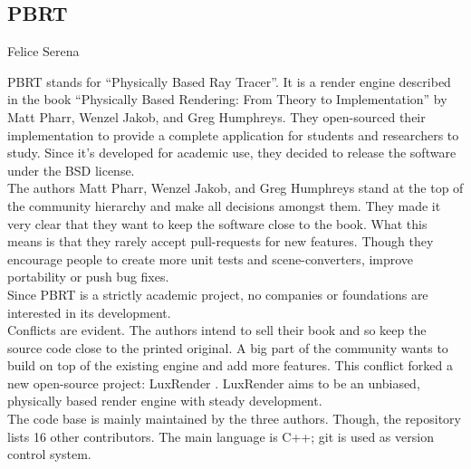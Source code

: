 \subsection{PBRT}{Felice Serena}

PBRT stands for ``Physically Based Ray Tracer''. It is a render engine described in the book ``Physically Based Rendering: From Theory to Implementation'' by Matt Pharr, Wenzel Jakob, and Greg Humphreys. They open-sourced their implementation to provide a complete application for students and researchers to study. Since it's developed for academic use, they decided to release the software under the BSD license. \\

The authors Matt Pharr, Wenzel Jakob, and Greg Humphreys stand at the top of the community hierarchy and make all decisions amongst them. They made it very clear that they want to keep the software close to the book. What this means is that they rarely accept pull-requests for new features. Though they encourage people to create more unit tests and scene-converters, improve portability or push bug fixes. \cite{pbrt-pull-requests} \\

Since PBRT is a strictly academic project, no companies or foundations are interested in its development. \\

Conflicts are evident. The authors intend to sell their book and so keep the source code close to the printed original. A big part of the community wants to build on top of the existing engine and add more features. This conflict forked a new open-source project: LuxRender \cite{luxrender-home}. LuxRender aims to be an unbiased, physically based render engine with steady development. \\

The code base is mainly maintained by the three authors. Though, the repository lists 16 other contributors. The main language is C++; git is used as version control system.

